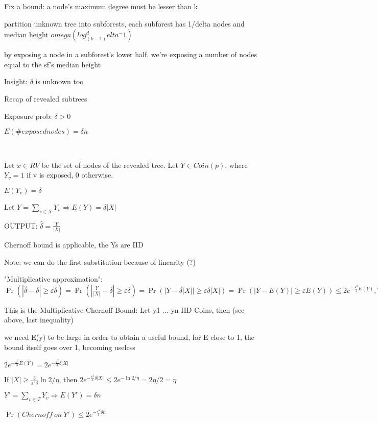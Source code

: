 \documentclass{report}
\begin{document}
	Fix a bound: a node's maximum degree must be lesser than k
	
	partition unknown tree into subforests, each subforest has 1/delta nodes and median height $omega(log_(k-1)^delta^-1)$
	
	by exposing a node in a subforest's lower half, we're exposing a number of nodes equal to the sf's median height
	
	
	
	
	Insight: $\delta$ is unknown too
	
	Recap of revealed subtrees
	
	Exposure prob: $\delta > 0$
	
	$E(\# exposed nodes) = \delta n$
	
	\
	
	Let $x \in RV$ be the set of nodes of the revealed tree. Let $Y \in Coin(p)$, where $Y_v = 1$ if v is exposed, 0 otherwise.
	
	$E(Y_v) = \delta$
	
	Let $ Y = \sum_{v \in X} Y_v \Rightarrow E(Y)= \delta |X|$
	
	OUTPUT: $\hat\delta = \frac{Y}{|X|}$
	
	Chernoff bound is applicable, the Ys are IID
	
	Note: we can do the first substitution because of linearity (?)
	
	"Multiplicative approximation": $\displaystyle \Pr(|\hat\delta - \delta| \geq \varepsilon \delta) = \Pr(|\frac{Y}{|X|} - \delta| \geq \varepsilon \delta) = \Pr(|Y - \delta |X|| \geq \varepsilon \delta |X|) = \Pr(|Y - E(Y)| \geq \varepsilon E(Y)) \leq 2e^{-\frac{\varepsilon^2}{3}E(Y)}, \forall \varepsilon \in (0, 1)$
	
	This is the Multiplicative Chernoff Bound: Let y1 ... yn IID Coins, then (see above, last inequality)
	
	we need E(y) to be large in order to obtain a useful bound, for E close to 1, the bound itself goes over 1, becoming useless
	
	$\displaystyle 2e^{-\frac{\varepsilon^2}{3}E(Y)} = 2e^{-\frac{\varepsilon^2}{3}\delta|X|}$
	
	If $\displaystyle |X| \geq \frac{3}{\varepsilon^2\delta}\ln2/\eta$, then $\displaystyle 2e^{-\frac{\varepsilon^2}{3}\delta|X|} \leq 2e^{-\ln2/\eta} = 2\eta/2 = \eta$
	
	$Y' = \sum_{v \in T}Y_v \Rightarrow E(Y') = \delta n$
	
	$\Pr(Chernoff\ on\ Y') \leq 2e^{-\frac{\varepsilon^2}{3}\delta n}$
	
\end{document}
